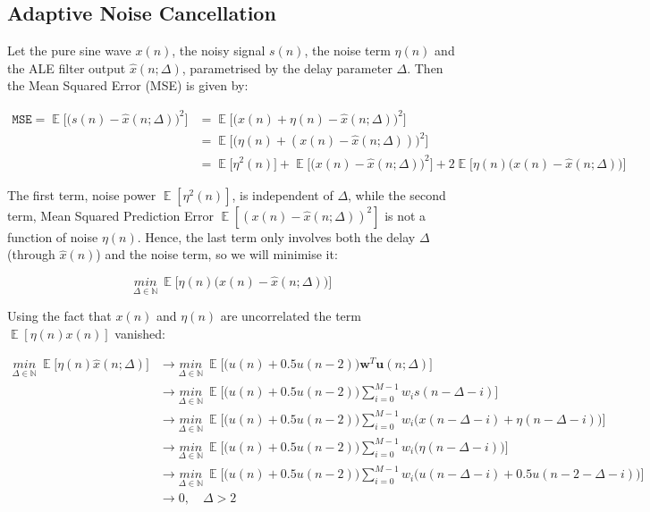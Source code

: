 \documentclass[12pt]{article}
\DeclareMathOperator*{\E}{\mathbb{E}}
\def\vw{{\bm{w}}}
\def\vu{{\bm{u}}}
\def\setNatural{{\mathbb{N}}}
\begin{document}
	\subsection{Adaptive Noise Cancellation} \label{sec: 2-3-ANC}
		Let the pure sine wave $x(n)$, the noisy signal $s(n)$, the noise term $\eta(n)$ and the ALE filter output $\hat{x}(n; \Delta)$, parametrised by the delay parameter $\Delta$.
		Then the Mean Squared Error (MSE) is given by:
		
		\begin{align}
		\mathtt{MSE} =
		\E \bigg[ \big( s(n) - \hat{x}(n; \Delta) \big)^{2} \bigg]  &=  \E \bigg[ \big( x(n) + \eta(n) - \hat{x}(n; \Delta) \big)^{2} \bigg] \\
		&=  \E \bigg[ \big( \eta(n) + (x(n) - \hat{x}(n; \Delta)) \big)^{2} \bigg] \\
		&=  \E \bigg[ \eta^{2}(n) \bigg] +
		\E \bigg[ \big( x(n) - \hat{x}(n; \Delta) \big)^{2} \bigg] +
		2\E \bigg[ \eta(n) \big(x(n) - \hat{x}(n; \Delta) \big) \bigg]
		\label{eq:ale_mse}
		\end{align}
		
		The first term, noise power $\E [ \eta^{2}(n) ]$, is independent of $\Delta$, while the second term, Mean Squared Prediction Error $\E [ (x(n) - \hat{x}(n; \Delta))^{2} ]$ is not
		a function of noise $\eta(n)$. Hence, the last term only involves both the delay $\Delta$ (through $\hat{x}(n)$) and the noise term, so we will minimise it:
		
		\begin{equation}
		\underset{\Delta \in \setNatural}{min}\ \E \bigg[ \eta(n) \big(x(n) - \hat{x}(n; \Delta) \big) \bigg]
		\end{equation}
		
		Using the fact that $x(n)$ and $\eta(n)$ are uncorrelated the term $\E [ \eta(n) x(n) ]$ vanished:
		
		\begin{align}
		\underset{\Delta \in \setNatural}{min}\ \E \bigg[ \eta(n) \hat{x}(n; \Delta) \bigg] &\rightarrow
		\underset{\Delta \in \setNatural}{min}\ \E \bigg[ \big( u(n) + 0.5u(n-2) \big) \vw^{T} \vu(n; \Delta) \bigg] \\
		&\rightarrow
		\underset{\Delta \in \setNatural}{min}\ \E \bigg[ \big( u(n) + 0.5u(n-2) \big) \sum_{i=0}^{M-1} w_{i} s(n - \Delta - i) \bigg] \\
		&\rightarrow
		\underset{\Delta \in \setNatural}{min}\ \E \bigg[ \big( u(n) + 0.5u(n-2) \big) \sum_{i=0}^{M-1} w_{i} \big( x(n - \Delta - i) + \eta(n - \Delta - i) \big) \bigg] \\
		&\rightarrow
		\underset{\Delta \in \setNatural}{min}\ \E \bigg[ \big( u(n) + 0.5u(n-2) \big) \sum_{i=0}^{M-1} w_{i} \big( \eta(n - \Delta - i) \big) \bigg] \\
		&\rightarrow
		\underset{\Delta \in \setNatural}{min}\ \E \bigg[ \big( u(n) + 0.5u(n-2) \big) \sum_{i=0}^{M-1} w_{i} \big( u(n - \Delta - i) + 0.5 u(n - 2 - \Delta - i) \big) \bigg]
		\label{con:delta} \\
		&\rightarrow
		0, \quad \Delta > 2
		\end{align}
		
\end{document}
